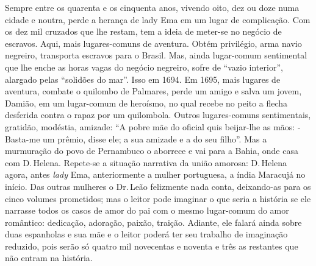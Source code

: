 Sempre entre os quarenta e os cinquenta anos, vivendo oito, dez ou doze
numa cidade e noutra, perde a herança de lady Ema em um lugar de
complicação. Com os dez mil cruzados que lhe restam, tem a ideia de
meter-se no negócio de escravos. Aqui, mais lugares-comuns de aventura.
Obtém privilégio, arma navio negreiro, transporta escravos para o
Brasil. Mas, ainda lugar-comum sentimental que lhe enche as horas vagas
do negócio negreiro, sofre de ``vazio interior'', alargado pelas ``solidões
do mar''. Isso em 1694. Em 1695, mais lugares de aventura, combate o
quilombo de Palmares, perde um amigo e salva um jovem, Damião, em um
lugar-comum de heroísmo, no qual recebe no peito a flecha desferida
contra o rapaz por um quilombola. Outros lugares-comuns sentimentais,
gratidão, modéstia, amizade: ``A pobre mãe do oficial quis beijar-lhe as
mãos: -Basta-me um prêmio, disse ele; a sua amizade e a do seu filho''.
Mas a murmuração do povo de Pernambuco o aborrece e vai para a Bahia,
onde casa com D.\,Helena. Repete-se a situação narrativa da união
amorosa: D.\,Helena agora, antes \emph{lady} Ema, anteriormente a mulher
portuguesa, a índia Maracujá no início. Das outras mulheres o Dr.\,Leão
felizmente nada conta, deixando-as para os cinco volumes prometidos; mas
o leitor pode imaginar o que seria a história se ele narrasse todos os
casos de amor do pai com o mesmo lugar-comum do amor romântico:
dedicação, adoração, paixão, traição. Adiante, ele falará ainda sobre
duas espanholas e sua mãe e o leitor poderá ter seu trabalho de
imaginação reduzido, pois serão só quatro mil novecentas e noventa e
três as restantes que não entram na história.

